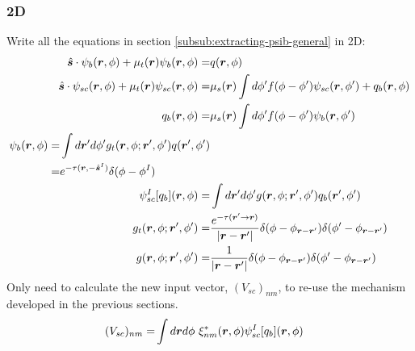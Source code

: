 \documentclass [10pt,letterpaper]{article}
\renewcommand{\vec}{\vectorsym}
\newcommand{\unitvec}[1]{\hat{\vec{#1}}}
\begin{document}
\subsubsection{2D}
\label{subsub:extracting-psib-2d}
Write all the equations in section \ref{subsub:extracting-psib-general} in 2D:
\begin{subequations} \label{eq:def-psib-psisc-qb-psiscI-result-psib-exp-gf-gft}
	\begin{align}
		\unitvec{s}
		\cdot 
		\psi_b(\vec{r},\phi)
		+
		\mu_t(\vec{r})
		\psi_b(\vec{r},\phi)
		=&
		q(\vec{r},\phi)
		\label{eq:def-psib-2d}
		\\
		\unitvec{s}
		\cdot 
		\psi_{sc}(\vec{r},\phi)
		+
		\mu_t(\vec{r})
		\psi_{sc}(\vec{r},\phi)
		=&
		\mu_s(\vec{r})
		\int d\phi^\prime
		f(\phi-\phi^\prime)
		\psi_{sc}(\vec{r},\phi^\prime)
		+
		q_b(\vec{r},\phi)
		\label{eq:def-psisc-2d}
		\\
		q_b(\vec{r},\phi)
		=&
		\mu_s(\vec{r})
		\int d\phi^\prime
		f(\phi-\phi^\prime)
		\psi_b(\vec{r},\phi^\prime) 
		\label{eq:def-qb-2d}
		\\
		\begin{split}
			\label{eq:result-psib-2d}
			\psi_b(\vec{r},\phi)
			=&
			\int d\vec{r}^\prime d\phi^\prime
			g_t(\vec{r},\phi;\vec{r}^\prime,\phi^\prime) 
			q(\vec{r}^\prime,\phi^\prime)
			\\
			=&
			e^{-\tau(\vec{r},-\unitvec{s}^I)}
			\delta(\phi-\phi^I) 
		\end{split} 
		\\
		\psi_{sc}^I[q_b](\vec{r},\phi)
		=&
		\int d\vec{r}^\prime d\phi^\prime
		g(\vec{r},\phi;\vec{r}^\prime,\phi^\prime)
		q_b(\vec{r}^\prime,\phi^\prime)
		\label{eq:def-psiscI-2d} 
		\\
		g_t(\vec{r},\phi;\vec{r}^\prime,\phi^\prime)
		=&
		\frac
		{e^{-\tau(\vec{r}^\prime\to\vec{r})}}
		{\lvert \vec{r}-\vec{r}^\prime \rvert}
		\delta(\phi-\phi_{\vec{r}-\vec{r}^\prime})
		\delta(\phi^\prime-\phi_{\vec{r}-\vec{r}^\prime})
		\label{eq:exp-gft-2d} 
		\\
		g(\vec{r},\phi;\vec{r}^\prime,\phi^\prime)
		=&
		\frac
		{1}
		{\lvert \vec{r}-\vec{r}^\prime \rvert}
		\delta(\phi-\phi_{\vec{r}-\vec{r}^\prime})
		\delta(\phi^\prime-\phi_{\vec{r}-\vec{r}^\prime})
		\label{eq:exp-gf-2d} 
	\end{align}
\end{subequations}
Only need to calculate the new input vector, $(V_{sc})_{n m}$, to re-use the mechanism developed in the previous sections.
\begin{equation} \label{eq:def-Vscnm-1pt}
	\begin{split}
		(V_{sc})_{n m}
		=&
		\int d\vec{r} d\phi
		\ \xi^*_{n m}
		(\vec{r},\phi)
		\psi_{sc}^I
		[q_b]
		(\vec{r},\phi) 
	\end{split}
\end{equation}
\end{document}
